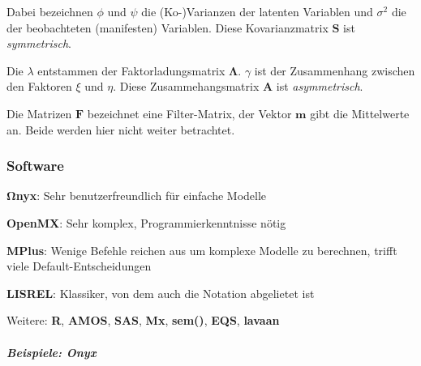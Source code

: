 \documentclass{article}
\numberwithin{equation}{section}
\begin{document}
Dabei bezeichnen $\phi$ und $\psi$ die (Ko-)Varianzen der latenten Variablen und $\sigma^2$ die der beobachteten (manifesten) Variablen. Diese Kovarianzmatrix $\mathbf{S}$ ist \emph{symmetrisch}.

Die $\lambda$ entstammen der Faktorladungsmatrix $\boldsymbol\Lambda$. $\gamma$ ist der Zusammenhang zwischen den Faktoren $\xi$ und $\eta$. Diese Zusammehangsmatrix $\mathbf{A}$ ist \emph{asymmetrisch}.

Die Matrizen $\mathbf{F}$ bezeichnet eine Filter-Matrix, der Vektor $\mathbf{m}$ gibt die Mittelwerte an. Beide werden hier nicht weiter betrachtet.

\subsubsection{Software}

\begin{compactitem}
\item $\boldsymbol\Omega$\textbf{nyx}: Sehr benutzerfreundlich für einfache Modelle
\item \textbf{OpenMX}: Sehr komplex, Programmierkenntnisse nötig
\item \textbf{MPlus}: Wenige Befehle reichen aus um komplexe Modelle zu berechnen, trifft viele Default-Entscheidungen
\item \textbf{LISREL}: Klassiker, von dem auch die Notation abgelietet ist
\item Weitere: \textbf{R}, \textbf{AMOS}, \textbf{SAS}, \textbf{Mx}, \textbf{sem()}, \textbf{EQS}, \textbf{lavaan}
\end{compactitem}

\subparagraph{Beispiele: Onyx}
\end{document}
